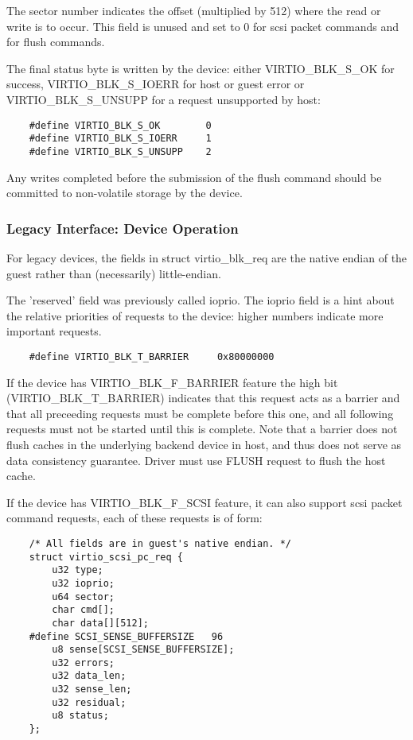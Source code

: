 The sector number indicates the offset (multiplied by 512) where
the read or write is to occur. This field is unused and set to 0
for scsi packet commands and for flush commands.

The final status byte is written by the device: either
VIRTIO_BLK_S_OK for success, VIRTIO_BLK_S_IOERR for host or guest
error or VIRTIO_BLK_S_UNSUPP for a request unsupported by host:

\begin{lstlisting}
	#define VIRTIO_BLK_S_OK        0
	#define VIRTIO_BLK_S_IOERR     1
	#define VIRTIO_BLK_S_UNSUPP    2
\end{lstlisting}

Any writes completed before the submission of the flush command should
be committed to non-volatile storage by the device.

\subsubsection{Legacy Interface: Device Operation}\label{sec:Device Types / Block Device / Device Operation / Legacy Interface: Device Operation}
For legacy devices, the fields in struct virtio_blk_req are the
native endian of the guest rather than (necessarily) little-endian.

The 'reserved' field was previously called ioprio.  The ioprio field
is a hint about the relative priorities of requests to the device:
higher numbers indicate more important requests.

\begin{lstlisting}
	#define VIRTIO_BLK_T_BARRIER	 0x80000000
\end{lstlisting}

If the device has VIRTIO_BLK_F_BARRIER
feature the high bit (VIRTIO_BLK_T_BARRIER) indicates that this
request acts as a barrier and that all preceeding requests must be
complete before this one, and all following requests must not be
started until this is complete. Note that a barrier does not flush
caches in the underlying backend device in host, and thus does not
serve as data consistency guarantee. Driver must use FLUSH request to
flush the host cache.

If the device has VIRTIO_BLK_F_SCSI feature, it can also support
scsi packet command requests, each of these requests is of form:

\begin{lstlisting}
	/* All fields are in guest's native endian. */
	struct virtio_scsi_pc_req {
		u32 type;
		u32 ioprio;
		u64 sector;
		char cmd[];
		char data[][512];
	#define SCSI_SENSE_BUFFERSIZE   96
		u8 sense[SCSI_SENSE_BUFFERSIZE];
		u32 errors;
		u32 data_len;
		u32 sense_len;
		u32 residual;
		u8 status;
	};
\end{lstlisting}

